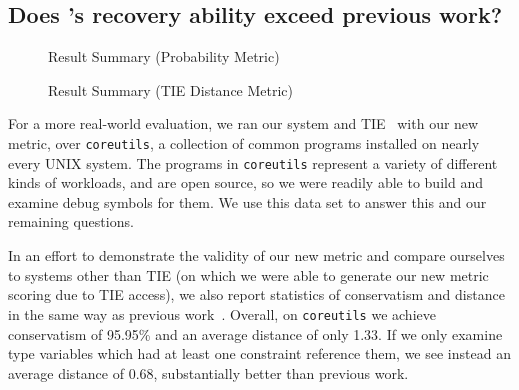 \subsection{Does \bitr's recovery ability exceed previous work?}
\label{subsec:evalprev}
\begin{figure}
\caption{Result Summary (Probability Metric)}
\label{bitr:fig:results-prob}
\end{figure}
\begin{figure}
\caption{Result Summary (TIE Distance Metric)}
\label{bitr:fig:results-tie}
\end{figure}

For a more real-world evaluation, we ran our system and TIE~\cite{tie} with our new metric, over \texttt{coreutils}, a collection of common programs installed on nearly every UNIX system. The programs in \texttt{coreutils} represent a variety of different kinds of workloads, and are open source, so we were readily able to build and examine debug symbols for them. We use this data set to answer this and our remaining questions.

In an effort to demonstrate the validity of our new metric and compare ourselves to systems other than TIE (on which we were able to generate our new metric scoring due to TIE access), we also report statistics of conservatism and distance in the same way as previous work~\cite{tie,sw}. Overall, on \texttt{coreutils} we achieve conservatism of 95.95\% and an average distance of only 1.33. If we only examine type variables which had at least one constraint reference them, we see instead an average distance of 0.68, substantially better than previous work.

